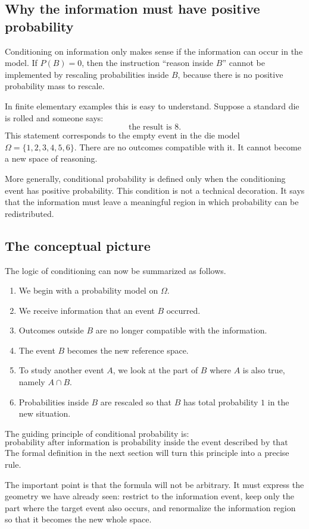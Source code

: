 \subsection*{Why the information must have positive probability}

Conditioning on information only makes sense if the information can occur in the
model. If \(P(B)=0\), then the instruction ``reason inside \(B\)'' cannot be
implemented by rescaling probabilities inside \(B\), because there is no positive
probability mass to rescale.

In finite elementary examples this is easy to understand. Suppose a standard die
is rolled and someone says:
\[
\text{the result is }8.
\]
This statement corresponds to the empty event in the die model
\(\Omega=\{1,2,3,4,5,6\}\). There are no outcomes compatible with it. It cannot
become a new space of reasoning.

More generally, conditional probability is defined only when the conditioning
event has positive probability. This condition is not a technical decoration. It
says that the information must leave a meaningful region in which probability can
be redistributed.

\subsection*{The conceptual picture}

The logic of conditioning can now be summarized as follows.

\begin{enumerate}
    \item We begin with a probability model on \(\Omega\).
    \item We receive information that an event \(B\) occurred.
    \item Outcomes outside \(B\) are no longer compatible with the information.
    \item The event \(B\) becomes the new reference space.
    \item To study another event \(A\), we look at the part of \(B\) where \(A\)
    is also true, namely \(A\cap B\).
    \item Probabilities inside \(B\) are rescaled so that \(B\) has total
    probability \(1\) in the new situation.
\end{enumerate}

\begin{theorembox}
The guiding principle of conditional probability is:
\[
\text{probability after information is probability inside the event described by that information.}
\]
The formal definition in the next section will turn this principle into a
precise rule.
\end{theorembox}

The important point is that the formula will not be arbitrary. It must express
the geometry we have already seen: restrict to the information event, keep only
the part where the target event also occurs, and renormalize the information
region so that it becomes the new whole space.
